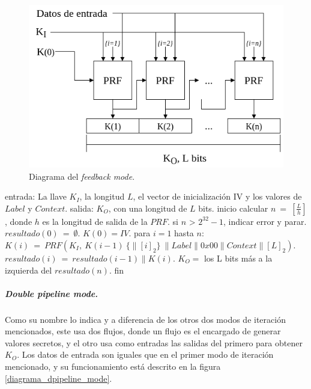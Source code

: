 \begin{figure}[H]
  \begin{center}
    \includegraphics[width=0.75\linewidth]{diagramas/feedback_mode}
    \caption{Diagrama del \textit{feedback mode}.}
    \label{diagrama_feedback_mode}
   \end{center}
\end{figure}

\begin{pseudocodigo}[caption={Funcionamiento del \textit{feedback mode}.}, 
label={mi:2}]
  entrada:   La llave $K_I$, la longitud $L$, el vector de inicialización IV 
             y los valores de $Label$ y $Context$.
  salida:    $K_O$, con una longitud de $L$ bits.
  inicio
    calcular $n\: =\: [\frac{L}{h}]$, donde $h$ es la longitud de salida de la $PRF$.
    si $n$ > $2^{32}-1$, indicar error y parar.
    $resultado(0)\: =\: \emptyset$.
    $K(0) = IV$.
    para $i=1$ hasta $n$:
      $K(i)\: = \:PRF(K_I,\: K(i-1)\: \{\parallel {[i]}_2\}\: \parallel Label \parallel 0x00 \parallel Context \parallel {[L]}_2 )$.
      $resultado(i)\: =\: resultado(i-1) \parallel K(i)$.
    $K_O =$ los L bits más a la izquierda del $resultado(n)$. 
  fin
\end{pseudocodigo}

\subparagraph{Double pipeline mode.}
Como su nombre lo indica y a diferencia de los otros dos modos de iteración 
mencionados, este usa dos flujos, donde un flujo es el encargado de generar 
valores secretos, y el otro usa como entradas las salidas del primero para 
obtener $K_O$. Los datos de entrada son iguales que en el primer modo de 
iteración mencionado, y su funcionamiento está descrito en la figura 
\ref{diagrama_dpipeline_mode}.

